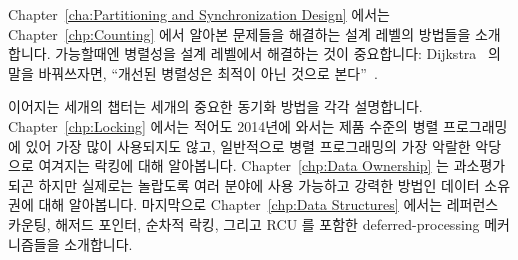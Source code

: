 
Chapter~\ref{cha:Partitioning and Synchronization Design} 에서는
Chapter~\ref{chp:Counting} 에서 알아본 문제들을 해결하는 설계 레벨의 방법들을
소개합니다.  가능할때엔 병렬성을 설계 레벨에서 해결하는 것이 중요합니다:
Dijkstra~\cite{Dijkstra:1968:LEG:362929.362947} 의 말을 바꿔쓰자면, ``개선된
병렬성은 최적이 아닌 것으로 본다''~\cite{PaulEMcKenney2012HOTPARsuboptimal}.


이어지는 세개의 챕터는 세개의 중요한 동기화 방법을 각각 설명합니다.
Chapter~\ref{chp:Locking} 에서는 적어도 2014년에 와서는 제품 수준의 병렬
프로그래밍에 있어 가장 많이 사용되지도 않고, 일반적으로 병렬 프로그래밍의 가장
악랄한 악당으로 여겨지는 락킹에 대해 알아봅니다.  Chapter~\ref{chp:Data
Ownership} 는 과소평가되곤 하지만 실제로는 놀랍도록 여러 분야에 사용 가능하고
강력한 방법인 데이터 소유권에 대해 알아봅니다.  마지막으로
Chapter~\ref{chp:Data Structures} 에서는 레퍼런스 카운팅, 해저드 포인터, 순차적
락킹, 그리고 RCU 를 포함한 deferred-processing 메커니즘들을 소개합니다.


